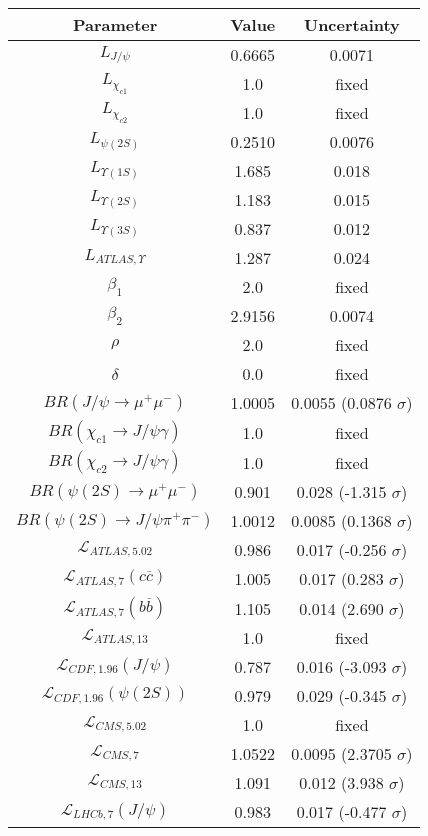 \begin{table}[h!]
\centering
\begin{tabular}{c|c|c}
Parameter & Value & Uncertainty \\
\hline
$L_{J/\psi}$ & 0.6665 & 0.0071 \\
$L_{\chi_{c1}}$ & 1.0 & fixed \\
$L_{\chi_{c2}}$ & 1.0 & fixed \\
$L_{\psi(2S)}$ & 0.2510 & 0.0076 \\
$L_{\Upsilon(1S)}$ & 1.685 & 0.018 \\
$L_{\Upsilon(2S)}$ & 1.183 & 0.015 \\
$L_{\Upsilon(3S)}$ & 0.837 & 0.012 \\
$L_{ATLAS,\Upsilon}$ & 1.287 & 0.024 \\
$\beta_1$ & 2.0 & fixed \\
$\beta_2$ & 2.9156 & 0.0074 \\
$\rho$ & 2.0 & fixed \\
$\delta$ & 0.0 & fixed \\
$BR(J/\psi\rightarrow\mu^+\mu^-)$ & 1.0005 & 0.0055 (0.0876 $\sigma$) \\
$BR(\chi_{c1}\rightarrow J/\psi\gamma)$ & 1.0 & fixed \\
$BR(\chi_{c2}\rightarrow J/\psi\gamma)$ & 1.0 & fixed \\
$BR(\psi(2S)\rightarrow\mu^+\mu^-)$ & 0.901 & 0.028 (-1.315 $\sigma$) \\
$BR(\psi(2S)\rightarrow J/\psi\pi^+\pi^-)$ & 1.0012 & 0.0085 (0.1368 $\sigma$) \\
$\mathcal L_{ATLAS,5.02}$ & 0.986 & 0.017 (-0.256 $\sigma$) \\
$\mathcal L_{ATLAS,7}(c\overline c)$ & 1.005 & 0.017 (0.283 $\sigma$) \\
$\mathcal L_{ATLAS,7}(b\overline b)$ & 1.105 & 0.014 (2.690 $\sigma$) \\
$\mathcal L_{ATLAS,13}$ & 1.0 & fixed \\
$\mathcal L_{CDF,1.96}(J/\psi)$ & 0.787 & 0.016 (-3.093 $\sigma$) \\
$\mathcal L_{CDF,1.96}(\psi(2S))$ & 0.979 & 0.029 (-0.345 $\sigma$) \\
$\mathcal L_{CMS,5.02}$ & 1.0 & fixed \\
$\mathcal L_{CMS,7}$ & 1.0522 & 0.0095 (2.3705 $\sigma$) \\
$\mathcal L_{CMS,13}$ & 1.091 & 0.012 (3.938 $\sigma$) \\
$\mathcal L_{LHCb,7}(J/\psi)$ & 0.983 & 0.017 (-0.477 $\sigma$) \\

\end{tabular}
\end{table}
